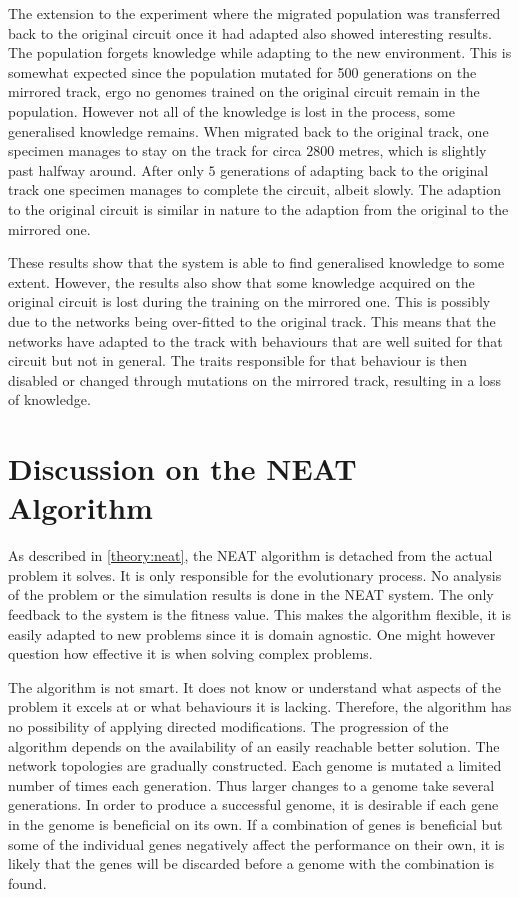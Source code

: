The extension to the experiment where the migrated population was transferred back to the original circuit once it had adapted also showed interesting results. The population forgets knowledge while adapting to the new environment. This is somewhat expected since the population mutated for 500 generations on the mirrored track, ergo no genomes trained on the original circuit remain in the population. However not all of the knowledge is lost in the process, some generalised knowledge remains. When migrated back to the original track, one specimen manages to stay on the track for circa $2800$ metres, which is slightly past halfway around. After only $5$ generations of adapting back to the original track one specimen manages to complete the circuit, albeit slowly. The adaption to the original circuit is similar in nature to the adaption from the original to the mirrored one. 

These results show that the system is able to find generalised knowledge to some extent. However, the results also show that some knowledge acquired on the original circuit is lost during the training on the mirrored one. This is possibly due to the networks being over-fitted to the original track. This means that the networks have adapted to the track with behaviours that are well suited for that circuit but not in general. The traits responsible for that behaviour is then disabled or changed through mutations on the mirrored track, resulting in a loss of knowledge.

\section{Discussion on the NEAT Algorithm}
\label{discussion:neat_mechanism}
As described in \ref{theory:neat}, the NEAT algorithm is detached from the actual problem it solves. It is only responsible for the evolutionary process. No analysis of the problem or the simulation results is done in the NEAT system. The only feedback to the system is the fitness value. This makes the algorithm flexible, it is easily adapted to new problems since it is domain agnostic. One might however question how effective it is when solving complex problems.  

The algorithm is not smart. It does not know or understand what aspects of the problem it excels at or what behaviours it is lacking. Therefore, the algorithm has no possibility of applying directed modifications. The progression of the algorithm depends on the availability of an easily reachable better solution. The network topologies are gradually constructed. Each genome is mutated a limited number of times each generation. Thus larger changes to a genome take several generations. In order to produce a successful genome, it is desirable if each gene in the genome is beneficial on its own. If a combination of genes is beneficial but some of the individual genes negatively affect the performance on their own, it is likely that the genes will be discarded before a genome with the combination is found.

